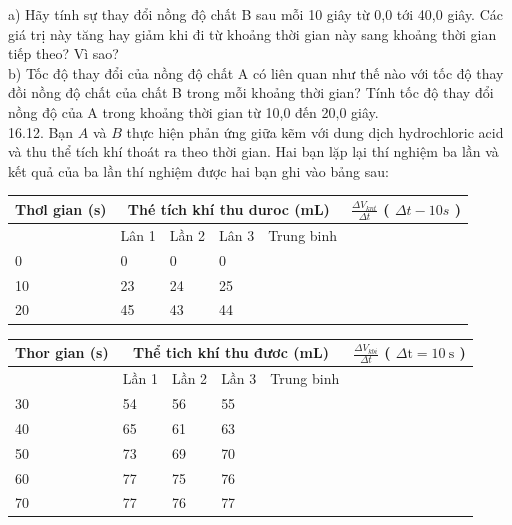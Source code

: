 \documentclass[10pt]{article}
\begin{document}
a) Hãy tính sự thay đổi nồng độ chất B sau mỗi 10 giây từ 0,0 tới 40,0 giây. Các giá trị này tăng hay giảm khi đi từ khoảng thời gian này sang khoảng thời gian tiếp theo? Vì sao?\\
b) Tốc độ thay đổi của nồng độ chất A có liên quan như thế nào với tốc độ thay đồi nồng độ chất của chất B trong mỗi khoảng thời gian? Tính tốc độ thay đổi nồng độ của A trong khoảng thời gian từ 10,0 đến 20,0 giây.\\
16.12. Bạn $A$ và $B$ thực hiện phản ứng giữa kẽm với dung dịch hydrochloric acid và thu thể tích khí thoát ra theo thời gian. Hai bạn lặp lại thí nghiệm ba lần và kết quả của ba lần thí nghiệm được hai bạn ghi vào bảng sau:

\begin{center}
\begin{tabular}{|l|l|l|l|l|l|}
\hline
\multirow{2}{*}{Thơl gian (s)} & \multicolumn{4}{|c|}{Thé tích khí thu duroc (mL)} & \multirow[b]{2}{*}{$\frac{\Delta V_{k n t}}{\Delta t}$ ( $\Delta t-10 s$ )} \\
\hline
 & Lân 1 & Lần 2 & Lân 3 & Trung binh &  \\
\hline
0 & 0 & 0 & 0 &  &  \\
\hline
10 & 23 & 24 & 25 &  &  \\
\hline
20 & 45 & 43 & 44 &  &  \\
\hline
\end{tabular}
\end{center}

\begin{center}
\begin{tabular}{|l|l|l|l|l|l|}
\hline
\multirow{2}{*}{Thor gian (s)} & \multicolumn{4}{|c|}{Thể tich khí thu đươc (mL)} & \multirow{2}{*}{$\frac{\Delta V_{k b i}}{\Delta t}$ ( $\Delta \mathrm{t}=10 \mathrm{~s}$ )} \\
\hline
 & Lần 1 & Lần 2 & Lần 3 & Trung binh &  \\
\hline
30 & 54 & 56 & 55 &  &  \\
\hline
40 & 65 & 61 & 63 &  &  \\
\hline
50 & 73 & 69 & 70 &  &  \\
\hline
60 & 77 & 75 & 76 &  &  \\
\hline
70 & 77 & 76 & 77 &  &  \\
\hline
\end{tabular}
\end{center}
\end{document}
